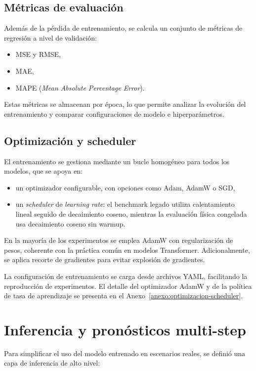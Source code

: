 \subsection{Métricas de evaluación}

Además de la pérdida de entrenamiento, se calcula un conjunto de métricas de regresión a nivel de validación:
\begin{itemize}
    \item MSE y RMSE,
    \item MAE,
    \item MAPE (\emph{Mean Absolute Percentage Error}).
\end{itemize}
Estas métricas se almacenan por época, lo que permite analizar la evolución del entrenamiento y comparar configuraciones de modelo e hiperparámetros.

\subsection{Optimización y scheduler}

El entrenamiento se gestiona mediante un bucle homogéneo para todos los modelos, que se apoya en:
\begin{itemize}
    \item un optimizador configurable, con opciones como Adam, AdamW o SGD,
    \item un \emph{scheduler} de \emph{learning rate}: el benchmark legado utiliza calentamiento lineal seguido de decaimiento coseno, mientras la evaluación física congelada usa decaimiento coseno sin warmup.
\end{itemize}

En la mayoría de los experimentos se emplea AdamW con regularización de pesos, coherente con la práctica común en modelos Transformer. Adicionalmente, se aplica recorte de gradientes para evitar explosión de gradientes.

\hfill

La configuración de entrenamiento se carga desde archivos YAML, facilitando la reproducción de experimentos. El detalle del optimizador AdamW y de la política de tasa de aprendizaje se presenta en el Anexo~\ref{anexo:optimizacion-scheduler}.

\section{Inferencia y pronósticos multi-step}
\label{sec:inferencia-y-rolling}

Para simplificar el uso del modelo entrenado en escenarios reales, se definió una capa de inferencia de alto nivel:

